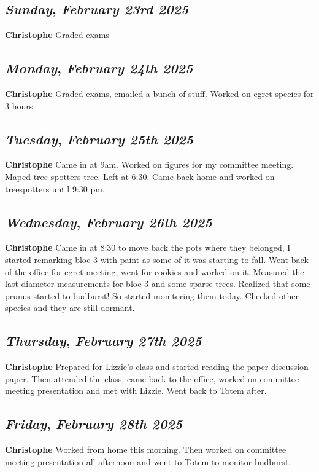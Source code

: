 \def\day{\textit{February 23rd 2025}}
\def\weekday{\textit{Sunday}}
\subsection*{\weekday, \day}
\textbf {Christophe}
Graded exams
\def\day{\textit{February 24th 2025}}
\def\weekday{\textit{Monday}}
\subsection*{\weekday, \day}
\textbf {Christophe}
Graded exams, emailed a bunch of stuff. Worked on egret species for 3 hours

\def\day{\textit{February 25th 2025}}
\def\weekday{\textit{Tuesday}}
\subsection*{\weekday, \day}
\textbf {Christophe}
Came in at 9am. Worked on figures for my committee meeting. Maped tree spotters tree. Left at 6:30. Came back home and worked on treespotters until 9:30 pm. 

\def\day{\textit{February 26th 2025}}
\def\weekday{\textit{Wednesday}}
\subsection*{\weekday, \day}
\textbf {Christophe}
Came in at 8:30 to move back the pots where they belonged, I started remarking bloc 3 with paint as some of it was starting to fall. Went back of the office for egret meeting, went for cookies and worked on it. Measured the last diameter measurements for bloc 3 and some sparse trees. Realized that some prunus started to budburst! So started monitoring them today. Checked other species and they are still dormant. 

\def\day{\textit{February 27th 2025}}
\def\weekday{\textit{Thursday}}
\subsection*{\weekday, \day}
\textbf {Christophe}
Prepared for Lizzie's class and started reading the paper discussion paper. Then attended the class, came back to the office, worked on committee meeting presentation and met with Lizzie. Went back to Totem after.

\def\day{\textit{February 28th 2025}}
\def\weekday{\textit{Friday}}
\subsection*{\weekday, \day}
\textbf {Christophe}
Worked from home this morning. Then worked on committee meeting presentation all afternoon and went to Totem to monitor budburst. 
